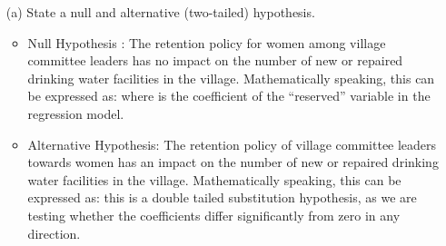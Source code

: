 \documentclass[12pt,letterpaper]{article}
\begin{document}
\newpage
\begin{enumerate}
	\item [(a)] State a null and alternative (two-tailed) hypothesis. 
	
	\begin{itemize}
		\item Null Hypothesis : The retention policy for women among village committee leaders has no impact on the number of new or repaired drinking water facilities in the village. Mathematically speaking, this can be expressed as: where is the coefficient of the “reserved” variable in the regression model.
		\item Alternative Hypothesis: The retention policy of village committee leaders towards women has an impact on the number of new or repaired drinking water facilities in the village. Mathematically speaking, this can be expressed as: this is a double tailed substitution hypothesis, as we are testing whether the coefficients differ significantly from zero in any direction.
		

\end{itemize}
\end{enumerate}
\end{document}
